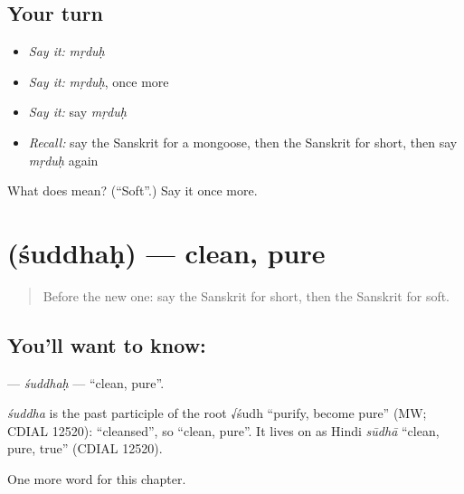 \subsection*{Your turn}
\begin{itemize}
\raggedright
  \item \emph{Say it:} \emph{mṛduḥ}
  \item \emph{Say it:} \emph{mṛduḥ}, once more
  \item \emph{Say it:} say \emph{mṛduḥ}
  \item \emph{Recall:} say the Sanskrit for a mongoose, then the Sanskrit for short, then say \emph{mṛduḥ} again
\end{itemize}

\begin{tcolorbox}[breakable,colback=teal!4,colframe=teal!35!black,title={Before you move on}]
What does  mean? (\textquotedblleft{}Soft\textquotedblright{}.) Say it once more.
\end{tcolorbox}
\section[\texorpdfstring{\sk{शुद्धः} (śuddhaḥ)}{शुद्धः (śuddhaḥ)}]{ (śuddhaḥ) — clean, pure}

\label{lesson:SA-C125-suddhah}



\begin{quote}
Before the new one: say the Sanskrit for short, then the Sanskrit for soft.
\end{quote}

\subsection*{You'll want to know: }
\textbf{} — \emph{śuddhaḥ} — \textquotedblleft{}clean, pure\textquotedblright{}.

\begin{cousinweb}
\emph{śuddha} is the past participle of the root √śudh \textquotedblleft{}purify, become pure\textquotedblright{} (MW; CDIAL 12520): \textquotedblleft{}cleansed\textquotedblright{}, so \textquotedblleft{}clean, pure\textquotedblright{}. It lives on as Hindi \emph{sūdhā} \textquotedblleft{}clean, pure, true\textquotedblright{} (CDIAL 12520).
\end{cousinweb}

\begin{grammarlens}[title={What you've built}]
One more word for this chapter.
\end{grammarlens}

